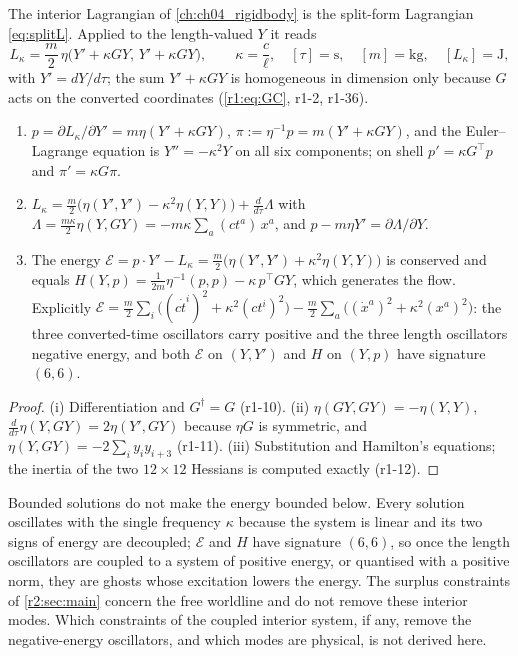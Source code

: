 The interior Lagrangian of \cref{ch:ch04_rigidbody} is the split-form Lagrangian \eqref{eq:splitL}. Applied to the length-valued $Y$ it reads
\begin{equation}
\label{r1:eq:Lkappa}
L_\kappa=\frac m2\,\eta\bigl(Y'+\kappa GY,\,Y'+\kappa GY\bigr),\qquad \kappa=\frac c\ell,\quad [\tau]=\mathrm s,\quad [m]=\mathrm{kg},\quad [L_\kappa]=\mathrm J,
\end{equation}
with $Y'=dY/d\tau$; the sum $Y'+\kappa GY$ is homogeneous in dimension only because $G$ acts on the converted coordinates (\eqref{r1:eq:GC},
r1-2, r1-36).

\begin{proposition}
\label{r1:prop:shift}
\begin{enumerate}[label=(\roman*),leftmargin=2.2em]
\item $p=\partial L_\kappa/\partial Y'=m\eta(Y'+\kappa GY)$, $\pi:=\eta^{-1}p=m(Y'+\kappa GY)$, and the Euler--Lagrange equation is
$Y''=-\kappa^2Y$ on all six components; on shell $p'=\kappa G^{\!\top}p$ and $\pi'=\kappa G\pi$.
\item $L_\kappa=\tfrac m2\bigl(\eta(Y',Y')-\kappa^2\eta(Y,Y)\bigr)+\tfrac{d}{d\tau}\Lambda$ with
$\Lambda=\tfrac{m\kappa}2\eta(Y,GY)=-m\kappa\sum_a(ct^a)\,x^a$, and $p-m\eta Y'=\partial\Lambda/\partial Y$.
\item The energy $\mathcal E=p\cdot Y'-L_\kappa=\tfrac m2\bigl(\eta(Y',Y')+\kappa^2\eta(Y,Y)\bigr)$ is conserved and equals
$H(Y,p)=\tfrac1{2m}\eta^{-1}(p,p)-\kappa\,p^{\!\top}GY$, which generates the flow. Explicitly
$\mathcal E=\tfrac m2\sum_i\bigl((c\dot t^i)^2+\kappa^2(ct^i)^2\bigr)-\tfrac m2\sum_a\bigl((\dot x^a)^2+\kappa^2(x^a)^2\bigr)$: the
three converted-time oscillators carry positive and the three length oscillators negative energy, and both $\mathcal E$ on $(Y,Y')$ and
$H$ on $(Y,p)$ have signature $(6,6)$.
\end{enumerate}
\end{proposition}

\begin{proof}
(i) Differentiation and $G^\dagger=G$ (r1-10). (ii) $\eta(GY,GY)=-\eta(Y,Y)$, $\tfrac{d}{d\tau}\eta(Y,GY)=2\eta(Y',GY)$ because $\eta G$ is
symmetric, and $\eta(Y,GY)=-2\sum_iy_iy_{i+3}$ (r1-11). (iii) Substitution and Hamilton's equations; the inertia of the two $12\times12$
Hessians is computed exactly (r1-12).
\end{proof}

Bounded solutions do not make the energy bounded below. Every solution oscillates with the single frequency $\kappa$ because the system is linear and its
two signs of energy are decoupled; $\mathcal E$ and $H$ have signature $(6,6)$, so once the length oscillators are coupled to a system of positive
energy, or quantised with a positive norm, they are ghosts whose excitation lowers the energy. The surplus constraints of \cref{r2:sec:main} concern the
free worldline and do not remove these interior modes. Which constraints of the coupled interior system, if any, remove the negative-energy
oscillators, and which modes are physical, is not derived here.

